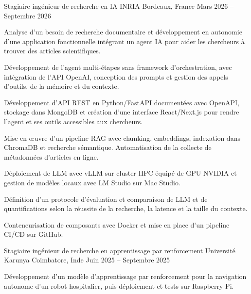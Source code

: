 
\begin{cventries}
  \cventry
    {Stagiaire ingénieur de recherche en IA}
    {INRIA}
    {Bordeaux, France}
    {Mars 2026 -- Septembre 2026}
    {
      \begin{cvitems}
        \item {Analyse d’un besoin de recherche documentaire et développement en autonomie d’une application fonctionnelle intégrant un agent IA pour aider les chercheurs à trouver des articles scientifiques.}
        \item {Développement de l’agent multi-étapes sans framework d’orchestration, avec intégration de l’API OpenAI, conception des prompts et gestion des appels d’outils, de la mémoire et du contexte.}
        \item {Développement d’API REST en Python/FastAPI documentées avec OpenAPI, stockage dans MongoDB et création d’une interface React/Next.js pour rendre l’agent et ses outils accessibles aux chercheurs.}
        \item {Mise en œuvre d’un pipeline RAG avec chunking, embeddings, indexation dans ChromaDB et recherche sémantique. Automatisation de la collecte de métadonnées d’articles en ligne.}
        \item {Déploiement de LLM avec vLLM sur cluster HPC équipé de GPU NVIDIA et gestion de modèles locaux avec LM Studio sur Mac Studio.}
        \item {Définition d’un protocole d’évaluation et comparaison de LLM et de quantifications selon la réussite de la recherche, la latence et la taille du contexte.}
        \item {Conteneurisation de composants avec Docker et mise en place d’un pipeline CI/CD sur GitHub.}
      \end{cvitems}
    }

  \cventry
    {Stagiaire ingénieur de recherche en apprentissage par renforcement}
    {Université Karunya}
    {Coimbatore, Inde}
    {Juin 2025 -- Septembre 2025}
    {
      \begin{cvitems}
        \item {Développement d’un modèle d’apprentissage par renforcement pour la navigation autonome d’un robot hospitalier, puis déploiement et tests sur Raspberry Pi.}
      \end{cvitems}
    }
\end{cventries}
